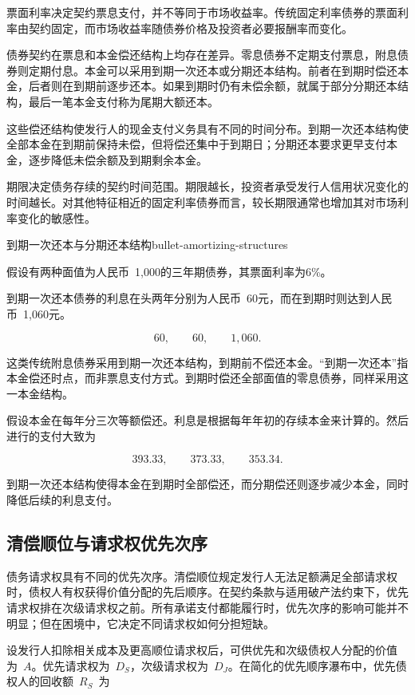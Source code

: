 票面利率决定契约票息支付，并不等同于市场收益率。传统固定利率债券的票面利率由契约固定，而市场收益率随债券价格及投资者必要报酬率而变化。

债券契约在票息和本金偿还结构上均存在差异。零息债券不定期支付票息，附息债券则定期付息。本金可以采用到期一次还本或分期还本结构。前者在到期时偿还本金，后者则在到期前逐步还本。如果到期时仍有未偿余额，就属于部分分期还本结构，最后一笔本金支付称为尾期大额还本。

这些偿还结构使发行人的现金支付义务具有不同的时间分布。到期一次还本结构使全部本金在到期前保持未偿，但将偿还集中于到期日；分期还本要求更早支付本金，逐步降低未偿余额及到期剩余本金。

期限决定债务存续的契约时间范围。期限越长，投资者承受发行人信用状况变化的时间越长。对其他特征相近的固定利率债券而言，较长期限通常也增加其对市场利率变化的敏感性。

\begin{example}{到期一次还本与分期还本结构}{bullet-amortizing-structures}

假设有两种面值为人民币~1,000的三年期债券，其票面利率为6\%。

到期一次还本债券的利息在头两年分别为人民币~60元，而在到期时则达到人民币~1,060元。

\[
60,\qquad 60,\qquad 1,060.
\]

这类传统附息债券采用到期一次还本结构，到期前不偿还本金。“到期一次还本”指本金偿还时点，而非票息支付方式。到期时偿还全部面值的零息债券，同样采用这一本金结构。

\medskip

假设本金在每年分三次等额偿还。利息是根据每年年初的存续本金来计算的。然后进行的支付大致为

\[
393.33,\qquad 373.33,\qquad 353.34.
\]

到期一次还本结构使得本金在到期时全部偿还，而分期偿还则逐步减少本金，同时降低后续的利息支付。 

\end{example}


\subsection{清偿顺位与请求权优先次序}

债务请求权具有不同的优先次序。清偿顺位规定发行人无法足额满足全部请求权时，债权人有权获得价值分配的先后顺序。在契约条款与适用破产法约束下，优先请求权排在次级请求权之前。所有承诺支付都能履行时，优先次序的影响可能并不明显；但在困境中，它决定不同请求权如何分担短缺。

设发行人扣除相关成本及更高顺位请求权后，可供优先和次级债权人分配的价值为~$A$。优先请求权为~$D_S$，次级请求权为~$D_J$。在简化的优先顺序瀑布中，优先债权人的回收额~$R_S$~为

